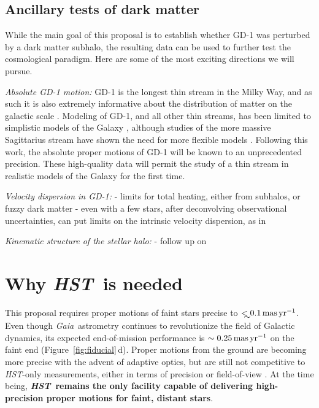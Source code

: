 \documentclass[12pt]{article}
\newcommand{\hst}{\textsl{HST}}
\newcommand{\gaia}{\textsl{Gaia}}
\begin{document}
\subsection*{Ancillary tests of dark matter}
While the main goal of this proposal is to establish whether GD-1 was perturbed by a dark matter subhalo, the resulting data can be used to further test the cosmological paradigm.
Here are some of the most exciting directions we will pursue.

\emph{Absolute GD-1 motion:}
GD-1 is the longest thin stream in the Milky Way, and as such it is also extremely informative about the distribution of matter on the galactic scale \parencite{bonaca2018}.
Modeling of GD-1, and all other thin streams, has been limited to simplistic models of the Galaxy \parencite[e.g.,][]{koposov2010}, although studies of the more massive Sagittarius stream have shown the need for more flexible models \parencite[e.g.,][]{ibata2013,fardal2018}.
Following this work, the absolute proper motions of GD-1 will be known to an unprecedented precision.
These high-quality data will permit the study of a thin stream in realistic models of the Galaxy for the first time.

\emph{Velocity dispersion in GD-1:}
- limits for total heating, either from subhalos, or fuzzy dark matter
- even with a few stars, after deconvolving observational uncertainties, can put limits on the intrinsic velocity dispersion, as in \textcite{sohn2016}

\emph{Kinematic structure of the stellar halo:}
- follow up on \parencite{deason2013}

\section*{Why \hst\ is needed}
This proposal requires proper motions of faint stars precise to $\lesssim0.1\,\rm mas\, yr^{-1}$.
Even though \gaia\ astrometry continues to revolutionize the field of Galactic dynamics, its expected end-of-mission performance is $\sim0.25\,\rm mas\,yr^{-1}$ on the faint end (Figure~\ref{fig:fiducial}\,d).
Proper motions from the ground are becoming more precise with the advent of adaptive optics, but are still not competitive to \hst-only measurements, either in terms of precision or field-of-view \parencite{fritz2017}.
At the time being, {\bf \hst\ remains the only facility capable of delivering high-precision proper motions for faint, distant stars}.

\end{document}
